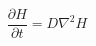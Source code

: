 \documentclass[preview]{standalone}
\begin{document}
\setcounter{equation}{0}
\begin{equation}
    \frac{\partial H}{\partial t} = D \nabla^2 H
\end{equation}
\end{document}
